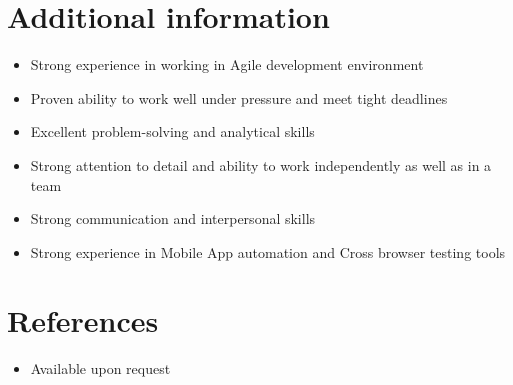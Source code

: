 \documentclass[letterpaper,11pt]{article}
\newcommand{\resumeSubHeadingListStart}{\begin{itemize}[leftmargin=*]}
\newcommand{\resumeSubHeadingListEnd}{\end{itemize}}
\begin{document}
\section{Additional information}
    \resumeSubHeadingListStart
        \item Strong experience in working in Agile development environment
        \item Proven ability to work well under pressure and meet tight deadlines
        \item Excellent problem-solving and analytical skills
        \item Strong attention to detail and ability to work independently as well as in a team
        \item Strong communication and interpersonal skills
        \item Strong experience in Mobile App automation and Cross browser testing tools
    \resumeSubHeadingListEnd
\section{References}
    \resumeSubHeadingListStart
        \item Available upon request
    \resumeSubHeadingListEnd
\end{document}
